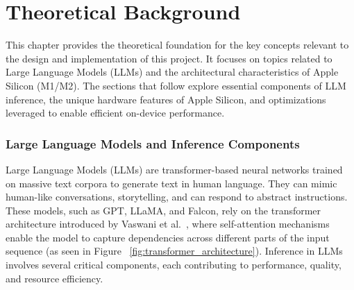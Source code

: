 
\chapter {Theoretical Background}
\label{ch:TheoreticalBackground}

This chapter provides the theoretical foundation for the key concepts relevant to the design and implementation of this project. It focuses on topics related to Large Language Models (LLMs) and the architectural characteristics of Apple Silicon (M1/M2). The sections that follow explore essential components of LLM inference, the unique hardware features of Apple Silicon, and optimizations leveraged to enable efficient on-device performance.

\subsection{Large Language Models and Inference Components}
\label{sec:LargeLanguageModelsAndInferenceComponents} 

Large Language Models (LLMs) are transformer-based neural networks trained on massive text corpora to generate text in human language. They can mimic human-like conversations, storytelling, and can respond to abstract instructions. These models, such as GPT, LLaMA, and Falcon, rely on the transformer architecture introduced by Vaswani et al.~\cite{vaswani2017attention}, where self-attention mechanisms enable the model to capture dependencies across different parts of the input sequence (as seen in Figure ~\ref{fig:transformer_architecture}). Inference in LLMs involves several critical components, each contributing to performance, quality, and resource efficiency.

